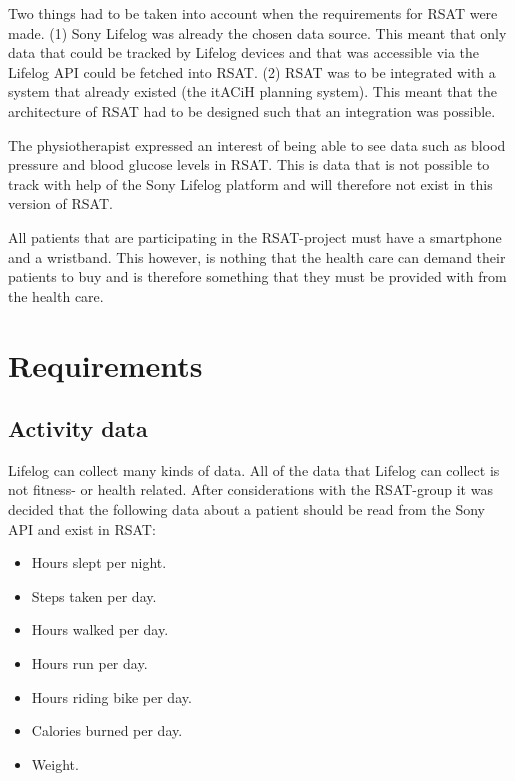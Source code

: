 \documentclass{cslthse-msc}
\begin{document}
Two things had to be taken into account when the requirements for RSAT were made. (1) Sony Lifelog was already the chosen data source. This meant that only data that could be tracked by Lifelog devices and that was accessible via the Lifelog API could be fetched into RSAT.  (2) RSAT was to be integrated with a system that already existed (the itACiH planning system). This meant that the architecture of RSAT had to be designed such that an integration was possible.

The physiotherapist expressed an interest of being able to see data such as blood pressure and blood glucose levels in RSAT. This is data that is not possible to track with help of the Sony Lifelog platform and will therefore not exist in this version of RSAT.

All patients that are participating in the RSAT-project must have a smartphone and a wristband. This however, is nothing that the health care can demand their patients to buy and is therefore something that they must be provided with from the health care.


\section{Requirements}
\label{sec:req}

\subsection{Activity data}



Lifelog can collect many kinds of data. All of the data that Lifelog can collect is not fitness- or health related. After considerations with the RSAT-group it was decided that the following data about a patient should be read from the Sony API and exist in RSAT:

\begin{itemize}
    \item Hours slept per night.
    \item Steps taken per day.
    \item Hours walked per day.
    \item Hours run per day.
    \item Hours riding bike per day.
    \item Calories burned per day.
    \item Weight.
\end{itemize}
\end{document}
